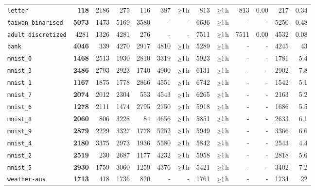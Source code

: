 \begin{tabular}{lrrrrrrrrrrrr}
\texttt{letter} & \textbf{118} & 2186 & 275 & 116 & 387 & $\mathsmaller{\geq}1$h & 813 & $\mathsmaller{\geq}1$h & 813 & 0.00 & 217 & 0.34\\
\texttt{taiwan\_binarised} & \textbf{5073} & 1473 & 5169 & 3580 & - & - & 6636 & $\mathsmaller{\geq}1$h & - & - & 5250 & 0.48\\
\texttt{adult\_discretized} & 4281 & 1326 & 4281 & 276 & - & - & 7511 & $\mathsmaller{\geq}1$h & 7511 & 0.00 & 4532 & 0.08\\
\texttt{bank} & \textbf{4046} & 339 & 4270 & 2917 & 4810 & $\mathsmaller{\geq}1$h & 5289 & $\mathsmaller{\geq}1$h & - & - & 4245 & 43\\
\texttt{mnist\_0} & \textbf{1468} & 2513 & 1930 & 2810 & 3319 & $\mathsmaller{\geq}1$h & 5923 & $\mathsmaller{\geq}1$h & - & - & 1781 & 5.4\\
\texttt{mnist\_3} & \textbf{2486} & 2793 & 2923 & 1740 & 4900 & $\mathsmaller{\geq}1$h & 6131 & $\mathsmaller{\geq}1$h & - & - & 2902 & 7.8\\
\texttt{mnist\_1} & \textbf{1167} & 1875 & 1778 & 2866 & 4551 & $\mathsmaller{\geq}1$h & 6742 & $\mathsmaller{\geq}1$h & - & - & 1542 & 5.1\\
\texttt{mnist\_7} & \textbf{2074} & 2012 & 2304 & 553 & 4543 & $\mathsmaller{\geq}1$h & 6265 & $\mathsmaller{\geq}1$h & - & - & 2163 & 5.2\\
\texttt{mnist\_6} & \textbf{1278} & 2111 & 1474 & 2795 & 2750 & $\mathsmaller{\geq}1$h & 5918 & $\mathsmaller{\geq}1$h & - & - & 1686 & 5.5\\
\texttt{mnist\_8} & \textbf{2060} & 806 & 3228 & 84 & 4656 & $\mathsmaller{\geq}1$h & 5851 & $\mathsmaller{\geq}1$h & - & - & 2633 & 6.1\\
\texttt{mnist\_9} & \textbf{2879} & 2229 & 3327 & 1778 & 5252 & $\mathsmaller{\geq}1$h & 5949 & $\mathsmaller{\geq}1$h & - & - & 3366 & 6.6\\
\texttt{mnist\_4} & \textbf{2180} & 3375 & 2973 & 1936 & 5580 & $\mathsmaller{\geq}1$h & 5842 & $\mathsmaller{\geq}1$h & - & - & 2543 & 4.4\\
\texttt{mnist\_2} & \textbf{2519} & 230 & 2687 & 1177 & 4232 & $\mathsmaller{\geq}1$h & 5958 & $\mathsmaller{\geq}1$h & - & - & 2818 & 5.6\\
\texttt{mnist\_5} & \textbf{2930} & 1759 & 3060 & 1259 & 4376 & $\mathsmaller{\geq}1$h & 5421 & $\mathsmaller{\geq}1$h & - & - & 3402 & 7.2\\
\texttt{weather-aus} & \textbf{1713} & 418 & 1736 & 820 & - & - & 1761 & $\mathsmaller{\geq}1$h & - & - & 1734 & 22\\
\bottomrule
\end{tabular}
